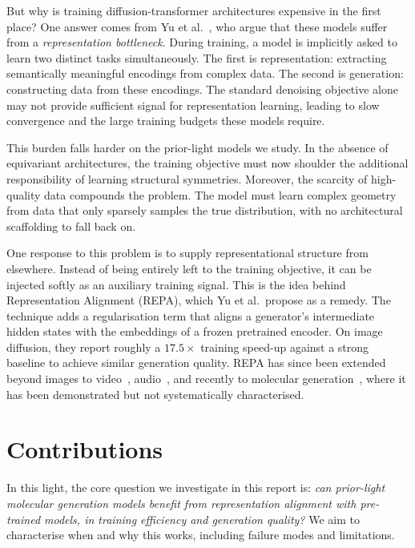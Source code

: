 \documentclass[12pt,a4paper,twoside]{report}
\begin{document}
But why is training diffusion-transformer architectures expensive in the first place? One answer comes from Yu et al.~\cite{REPA}, who argue that these models suffer from a \emph{representation bottleneck}. During training, a model is implicitly asked to learn two distinct tasks simultaneously. The first is representation: extracting semantically meaningful encodings from complex data. The second is generation: constructing data from these encodings. The standard denoising objective alone may not provide sufficient signal for representation learning, leading to slow convergence and the large training budgets these models require.

This burden falls harder on the prior-light models we study. In the absence of equivariant architectures, the training objective must now shoulder the additional responsibility of learning structural symmetries. Moreover, the scarcity of high-quality data compounds the problem. The model must learn complex geometry from data that only sparsely samples the true distribution, with no architectural scaffolding to fall back on.

One response to this problem is to supply representational structure from elsewhere. Instead of being entirely left to the training objective, it can be injected softly as an auxiliary training signal. This is the idea behind Representation Alignment (REPA), which Yu et al.~propose as a remedy. The technique adds a regularisation term that aligns a generator's intermediate hidden states with the embeddings of a frozen pretrained encoder. On image diffusion, they report roughly a $17.5\times$ training speed-up against a strong baseline to achieve similar generation quality. REPA has since been extended beyond images to video~\cite{VideoREPA}, audio~\cite{TARO}, and recently to molecular generation~\cite{REED,BoltzREPA}, where it has been demonstrated but not systematically characterised.

\section{Contributions}
\label{sec:contributions}

In this light, the core question we investigate in this report is: \emph{can prior-light molecular generation models benefit from representation alignment with pre-trained models, in training efficiency and generation quality?} We aim to characterise when and why this works, including failure modes and limitations.
\end{document}

